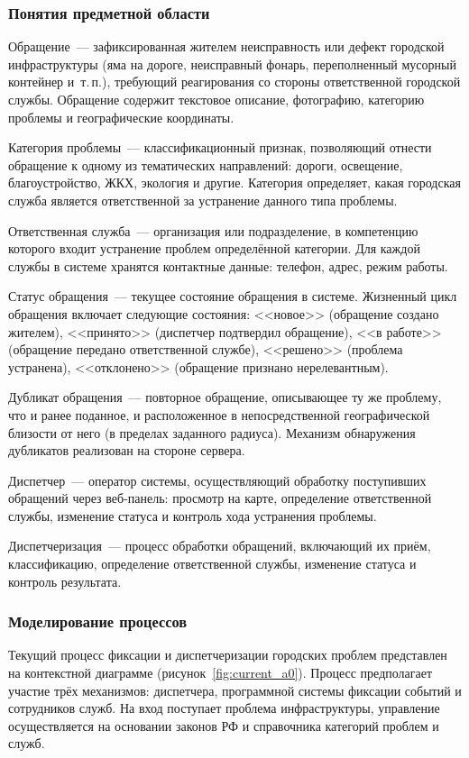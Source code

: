 \subsubsection{Понятия предметной области}

Обращение~--- зафиксированная жителем неисправность или дефект городской инфраструктуры (яма на дороге, неисправный фонарь, переполненный мусорный контейнер и~т.\,п.), требующий реагирования со стороны ответственной городской службы. Обращение содержит текстовое описание, фотографию, категорию проблемы и географические координаты.

Категория проблемы~--- классификационный признак, позволяющий отнести обращение к одному из тематических направлений: дороги, освещение, благоустройство, ЖКХ, экология и другие. Категория определяет, какая городская служба является ответственной за устранение данного типа проблемы.

Ответственная служба~--- организация или подразделение, в компетенцию которого входит устранение проблем определённой категории. Для каждой службы в системе хранятся контактные данные: телефон, адрес, режим работы.

Статус обращения~--- текущее состояние обращения в системе. Жизненный цикл обращения включает следующие состояния: <<новое>> (обращение создано жителем), <<принято>> (диспетчер подтвердил обращение), <<в работе>> (обращение передано ответственной службе), <<решено>> (проблема устранена), <<отклонено>> (обращение признано нерелевантным).

Дубликат обращения~--- повторное обращение, описывающее ту же проблему, что и ранее поданное, и расположенное в непосредственной географической близости от него (в пределах заданного радиуса). Механизм обнаружения дубликатов реализован на стороне сервера.

Диспетчер~--- оператор системы, осуществляющий обработку поступивших обращений через веб-панель: просмотр на карте, определение ответственной службы, изменение статуса и контроль хода устранения проблемы.

Диспетчеризация~--- процесс обработки обращений, включающий их приём, классификацию, определение ответственной службы, изменение статуса и контроль результата.

\subsubsection{Моделирование процессов}

Текущий процесс фиксации и диспетчеризации городских проблем представлен на контекстной диаграмме (рисунок~\ref{fig:current_a0}). Процесс предполагает участие трёх механизмов: диспетчера, программной системы фиксации событий и сотрудников служб. На вход поступает проблема инфраструктуры, управление осуществляется на основании законов РФ и справочника категорий проблем и служб.

